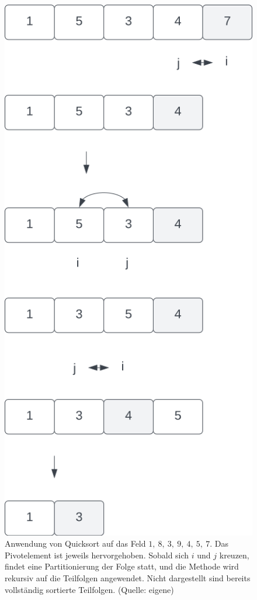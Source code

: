 \begin{figure}
\begin{center}
        \includegraphics[scale=0.3]{chapters/Sortierverfahren/img/quicksort2}
        \caption{Anwendung von Quicksort auf das Feld $1,\ 8,\ 3,\ 9,\ 4,\ 5,\ 7$. Das Pivotelement ist jeweils hervorgehoben. Sobald sich $i$ und $j$ kreuzen, findet eine Partitionierung der Folge statt, und die Methode wird rekursiv auf die Teilfolgen angewendet. Nicht dargestellt sind bereits vollständig sortierte Teilfolgen. (Quelle: eigene)}
        \label{fig:quicksort}
    \end{center}
\end{figure}


